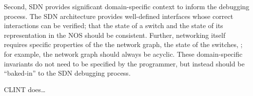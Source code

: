 Second, SDN provides significant domain-specific context to inform the debugging process.
The  SDN architecture provides well-defined interfaces whose correct interactions can be verified; \eg{} that the state of a switch and the state of its representation in the NOS should be consistent.
Further, networking itself requires specific properties of the the network graph, the state of the switches, \etc{}; for example, the network graph should always be acyclic.
These domain-specific invariants do not need to be specified by the programmer, but instead should be ``baked-in'' to the SDN debugging process.

CLINT does\ldots
